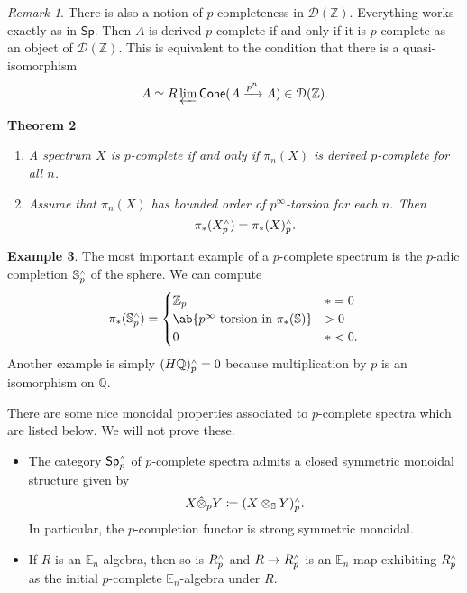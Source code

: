 \documentclass[10pt]{amsart}
\newtheorem{thm}{Theorem}[subsection]
\theoremstyle{definition}
\newtheorem{exm}[thm]{Example}
\theoremstyle{remark}
\newtheorem{rmk}[thm]{Remark}
\theoremstyle{plain}
\theoremstyle{definition}
\theoremstyle{remark}
\newcommand{\Z}{\mathbb{Z}}
\newcommand{\Q}{\mathbb{Q}}
\newcommand{\E}{\mathbb{E}}
\newcommand{\bS}{\mathbb{S}}
\newcommand{\mc}[1]{\mathcal{#1}}
\newcommand{\ms}[1]{\mathsf{#1}}
\newcommand{\1}{\mathbf{1}}
\newcommand{\2}{\mathbf{2}}
\newcommand{\3}{\mathbf{3}}
\newcommand{\sw}{\mathsmaller{\wedge}}
\begin{document}
\begin{rmk}
    There is also a notion of $p$-completeness in $\mc{D}(\Z)$. Everything works exactly as in $\ms{Sp}$. Then $A$ is derived $p$-complete if and only if it is $p$-complete as an object of $\mc{D}(\Z)$. This is equivalent to the condition that there is a quasi-isomorphism
    \[ A \simeq R\varprojlim \ms{Cone}(A \xrightarrow{p^n} A) \in \mc{D}(\Z). \]
\end{rmk}

\begin{thm}\leavevmode
    \begin{enumerate}
        \item A spectrum $X$ is $p$-complete if and only if $\pi_n (X)$ is derived $p$-complete for all $n$.
        \item Assume that $\pi_n(X)$ has bounded order of $p^{\infty}$-torsion for each $n$. Then
        \[ \pi_* (X_p^{\sw}) = \pi_*(X)_p^{\sw}. \]
    \end{enumerate}
\end{thm}

\begin{exm}
    The most important example of a $p$-complete spectrum is the $p$-adic completion $\bS_p^{\sw}$ of the sphere. We can compute
    \[ \pi_*(\bS_p^{\sw}) = \begin{cases}
        \Z_p & *=0 \\
        \ab\{\text{$p^{\infty}$-torsion in } \pi_*(\bS) \} & > 0 \\
        0 & * < 0.
    \end{cases} \]
    Another example is simply $(H\Q)_p^{\sw} = 0$ because multiplication by $p$ is an isomorphism on $\Q$.
\end{exm}

There are some nice monoidal properties associated to $p$-complete spectra which are listed below. We will not prove these.
\begin{itemize}
    \item The category $\ms{Sp}_p^{\sw}$ of $p$-complete spectra admits a closed symmetric monoidal structure given by
    \[ X \hat{\otimes}_p Y \coloneqq (X \otimes_{\bS} Y)_p^{\sw}. \]
    In particular, the $p$-completion functor is strong symmetric monoidal.
    \item If $R$ is an $\E_n$-algebra, then so is $R_p^{\sw}$ and $R \to R_p^{\sw}$ is an $\E_n$-map exhibiting $R_p^{\sw}$ as the initial $p$-complete $\E_n$-algebra under $R$.
\end{itemize}
\end{document}

